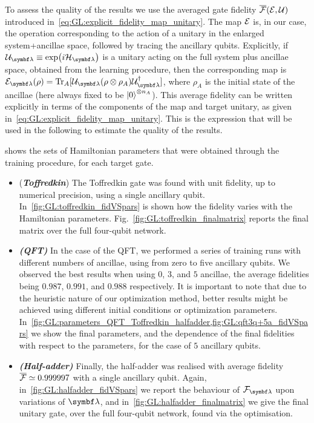 To assess the quality of the results we use the averaged gate fidelity $\overline{{\mathcal{F}}}({\mathcal{E}},{\mathcal{U}})$ introduced in~\cref{eq:GL:explicit_fidelity_map_unitary}.
The map ${\mathcal{E}}$ is, in our case, the operation corresponding to the action of a unitary in the enlarged system+ancillae space, followed by tracing the ancillary qubits.
Explicitly, if $\calU_\bslambda\equiv\exp(i\calH_\bslambda)$ is a unitary acting on the full system plus ancillae space, obtained from the learning procedure, then the corresponding map is
$\calE_\bslambda(\rho) = \Tr_A[\calU_\bslambda(\rho\otimes\rho_A) \calU_\bslambda^\dagger]$,
where $\rho_A$ is the initial state of the ancillae (here always fixed to be $\ket0^{\otimes n_A}$).
This average fidelity can be written explicitly in terms of the components of the map and target unitary, as given in~\cref{eq:GL:explicit_fidelity_map_unitary}. This is the expression that will be used in the following to estimate the quality of the results.

 shows the sets of Hamiltonian parameters that were obtained through the training procedure, for each target gate.
\begin{itemize}
    \item (\textbf{\emph{Toffredkin}}) The Toffredkin gate was found with unit fidelity, up to numerical precision, using a single ancillary qubit. In~\cref{fig:GL:toffredkin_fidVSpars} is shown how the fidelity varies with the Hamiltonian parameters. Fig.~\ref{fig:GL:toffredkin_finalmatrix} reports the final matrix over the full four-qubit network.
    \item \textbf{\emph{(QFT)}} In the case of the \ac{QFT}, we performed a series of training runs with different numbers of ancillae, using from zero to five ancillary qubits.
    We observed the best results when using $0$, $3$, and $5$ ancillae, the average fidelities being $0.987$, $0.991$, and $0.988$ respectively.
    It is important to note that due to the heuristic nature of our optimization method, better results might be achieved using different initial conditions or optimization parameters.
    In~\cref{fig:GL:parameters_QFT_Toffredkin_halfadder,fig:GL:qft3q+5a_fidVSpars} we show the final parameters, and the dependence of the final fidelities with respect to the parameters, for the case of $5$ ancillary qubits.
    \item \textbf{\emph{(Half-adder)}} Finally, the half-adder was realised with average fidelity $\overline{{\mathcal{F}}}\simeq0.999997$ with a single ancillary qubit.
    Again, in~\cref{fig:GL:halfadder_fidVSpars} we report the behaviour of $\calF_\bslambda$ upon variations of $\bslambda$, and in~\cref{fig:GL:halfadder_finalmatrix} we give the final unitary gate, over the full four-qubit network, found via the optimisation.
\end{itemize}

